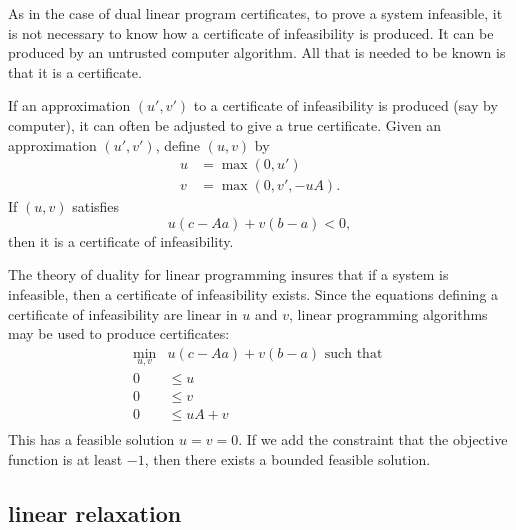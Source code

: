 As in the case of dual linear program certificates, 
to prove a system infeasible, it is not necessary to know how a
certificate of infeasibility is produced.  It can be produced 
by an untrusted computer algorithm.  All that is needed
to be known is that it is a certificate.

If an approximation $(u',v')$ to a certificate of infeasibility is
produced (say by computer), it can often be adjusted to give a
true certificate.  Given an approximation $(u',v')$, define
$(u,v)$ by
    $$
    \begin{array}{lll}
    u &= \max(0,u')\\
    v &= \max(0,v',-u A).
    \end{array}
    $$
If $(u,v)$ satisfies
    $$u( c-A a) + v(b-a) <0,$$
then it is a certificate of infeasibility.

The theory of duality for linear programming insures that if a
system is infeasible, then a certificate of infeasibility exists.
Since the equations defining a certificate of infeasibility are
linear in $u$ and $v$, linear programming algorithms may be used
to produce certificates:
    $$
    \begin{array}{rll}
        \min_{u,v} &u (c-A a) + v(b-a) \text{ such that }\\
        0 &\le u\\
        0 &\le v \\
        0& \le u A + v\\
    \end{array}
    $$
This has a feasible solution $u=v=0$.  If we add the constraint
that the objective function is at least $-1$, then there exists a
bounded feasible solution.

%

\subsection{linear relaxation}

